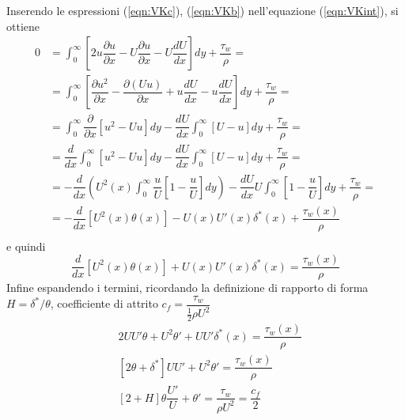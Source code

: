 Inserendo le espressioni (\ref{eqn:VKc}), (\ref{eqn:VKb}) nell'equazione (\ref{eqn:VKint}), si ottiene
 \begin{equation}
  \begin{aligned} 
  0 & = \int_{0}^{\infty} \left[ 2 u \dfrac{\partial u}{\partial x} -  U \dfrac{\partial u}{\partial x} - U \dfrac{d U}{d x} \right] dy + \dfrac{\tau_w}{\rho} = \\
    & = \int_{0}^{\infty} \left[ \dfrac{\partial u^2}{\partial x}
        - \dfrac{\partial (U u)}{\partial x} + u \dfrac{d U}{d x} - u \dfrac{d U}{d x} \right] dy + \dfrac{\tau_w}{\rho} = \\
    & = \int_{0}^{\infty}  \dfrac{\partial}{\partial x} \left[ u^2 - U u \right] dy
    - \dfrac{dU}{dx} \int_{0}^{\infty} \left[ U - u \right]dy + \dfrac{\tau_w}{\rho} = \\
   & = \dfrac{d}{d x} \int_{0}^{\infty}   \left[ u^2 - U u \right] dy
    - \dfrac{dU}{dx} \int_{0}^{\infty} \left[ U - u \right]dy + \dfrac{\tau_w}{\rho} = \\
   & = - \dfrac{d}{d x} \left( U^2(x) \int_{0}^{\infty}  \dfrac{u}{U}  \left[ 1 -  \dfrac{u}{U} \right] dy \right)
    - \dfrac{dU}{dx} U \int_{0}^{\infty} \left[ 1 - \dfrac{u}{U} \right] dy + \dfrac{\tau_w}{\rho} = \\
   & = - \dfrac{d}{d x} \left[ U^2(x) \theta(x) \right] - U (x)U' (x)\delta^*(x)+ \dfrac{\tau_w(x)}{\rho} \\
  \end{aligned}
 \end{equation}
e quindi
 \begin{equation}
  \dfrac{d}{d x} \left[ U^2(x) \theta(x) \right] + U (x)U' (x)\delta^*(x) = \dfrac{\tau_w(x)}{\rho}
 \end{equation}
 Infine espandendo i termini, ricordando la definizione di rapporto di forma $H = \delta^* / \theta$, coefficiente di attrito $c_f = \dfrac{\tau_w}{\frac{1}{2}\rho U^2}$
 \begin{equation}
 \begin{aligned}
  & 2 U U' \theta + U^2 \theta' + U U' \delta^*(x) = \dfrac{\tau_w(x)}{\rho} \\
  & [ 2 \theta + \delta^*] U U' + U^2 \theta' = \dfrac{\tau_w(x)}{\rho} \\
  & [ 2 + H ]\theta \dfrac{U'}{U}  +  \theta' = \dfrac{\tau_w}{\rho U^2} = \dfrac{c_f}{2}
 \end{aligned}
 \end{equation}

